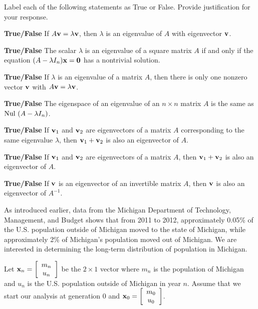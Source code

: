 \item Label each of the following statements as True or False. Provide justification for your response.
	\ba
	\item \textbf{True/False} If $A\mathbf{v} = \lambda \mathbf{v}$, then $\lambda$ is an eigenvalue of $A$ with eigenvector $\mathbf{v}$.
	\item \textbf{True/False} The scalar $\lambda$ is an eigenvalue of a square matrix $A$ if and only if the equation $(A - \lambda I_n) \mathbf{x} = \mathbf{0}$ has a nontrivial solution. 
	\item \textbf{True/False} If $\lambda$ is an eigenvalue of a matrix $A$, then there is only one nonzero vector $\mathbf{v}$ with $A \mathbf{v} = \lambda \mathbf{v}$.  
	\item \textbf{True/False} The eigenspace of an eigenvalue of an $n \times n$ matrix $A$ is the same as $\text{Nul } (A - \lambda I_n)$. 
	\item \textbf{True/False} If $\mathbf{v}_1$ and $\mathbf{v}_2$ are eigenvectors of a matrix $A$ corresponding to the same eigenvalue $\lambda$, then $\mathbf{v}_1 + \mathbf{v}_2$ is also an eigenvector of $A$.	
	\item \textbf{True/False} If $\mathbf{v}_1$ and $\mathbf{v}_2$ are eigenvectors of a matrix $A$, then $\mathbf{v}_1 + \mathbf{v}_2$ is also an eigenvector of $A$. 
	\item \textbf{True/False} If $\mathbf{v}$ is an eigenvector of an invertible matrix $A$, then $\mathbf{v}$ is also an eigenvector of $A^{-1}$.
	\ea
	
\ee


As introduced earlier, data from the Michigan Department of Technology, Management, and Budget shows that from 2011 to 2012, approximately 0.05\% of the U.S. population outside of Michigan moved to the state of Michigan, while approximately 2\% of Michigan's population moved out of Michigan. We are interested in determining the long-term distribution of population in Michigan. 

Let $\mathbf{x}_n = \left[ \begin{array}{c} m_n \\ u_n  \end{array} \right]$ be the $2 \times 1$ vector where $m_n$ is the population of Michigan and $u_n$ is the U.S. population outside of Michigan in year $n$. Assume that we start our analysis at generation 0 and $\mathbf{x}_0 = \left[ \begin{array}{c} m_0 \\ u_0 \end{array} \right]$.

